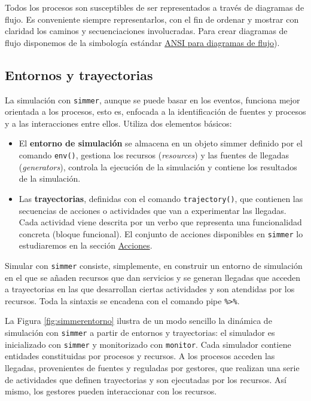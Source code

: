 \documentclass[
]{book}
\providecommand{\tightlist}{%
  \setlength{\itemsep}{0pt}\setlength{\parskip}{0pt}}
\theoremstyle{definition}
\theoremstyle{definition}
\theoremstyle{definition}
\theoremstyle{definition}
\theoremstyle{remark}
\begin{document}
Todos los procesos son susceptibles de ser representados a través de diagramas de flujo. Es conveniente siempre representarlos, con el fin de ordenar y mostrar con claridad los caminos y secuenciaciones involucradas. Para crear diagramas de flujo disponemos de la simbología estándar \href{https://docs.google.com/document/d/1F7urSCA-82umRB8a85P67yOiS35HNmbuL1FpLjemQ8Q/edit?usp=sharing}{ANSI para diagramas de flujo}).

\hypertarget{entornos-y-trayectorias}{%
\subsection{Entornos y trayectorias}\label{entornos-y-trayectorias}}

La simulación con \texttt{simmer}, aunque se puede basar en los eventos, funciona mejor orientada a los procesos, esto es, enfocada a la identificación de fuentes y procesos y a las interacciones entre ellos. Utiliza dos elementos básicos:

\begin{itemize}
\tightlist
\item
  El \textbf{entorno de simulación} se almacena en un objeto simmer definido por el comando \texttt{env()}, gestiona los recursos (\emph{resources}) y las fuentes de llegadas (\emph{generators}), controla la ejecución de la simulación y contiene los resultados de la simulación.
\item
  Las \textbf{trayectorias}, definidas con el comando \texttt{trajectory()}, que contienen las secuencias de acciones o actividades que van a experimentar las llegadas. Cada actividad viene descrita por un verbo que representa una funcionalidad concreta (bloque funcional). El conjunto de acciones disponibles en \texttt{simmer} lo estudiaremos en la sección \href{@acciones}{Acciones}.
\end{itemize}

Simular con \texttt{simmer} consiste, simplemente, en construir un entorno de simulación en el que se añaden recursos que dan servicios y se generan llegadas que acceden a trayectorias en las que desarrollan ciertas actividades y son atendidas por los recursos. Toda la sintaxis se encadena con el comando pipe \texttt{\%\textgreater{}\%}.

La Figura \ref{fig:simmerentorno} ilustra de un modo sencillo la dinámica de simulación con \texttt{simmer} a partir de entornos y trayectorias: el simulador es inicializado con \texttt{simmer} y monitorizado con \texttt{monitor}. Cada simulador contiene entidades constituidas por procesos y recursos. A los procesos acceden las llegadas, provenientes de fuentes y reguladas por gestores, que realizan una serie de actividades que definen trayectorias y son ejecutadas por los recursos. Así mismo, los gestores pueden interaccionar con los recursos.
\end{document}
